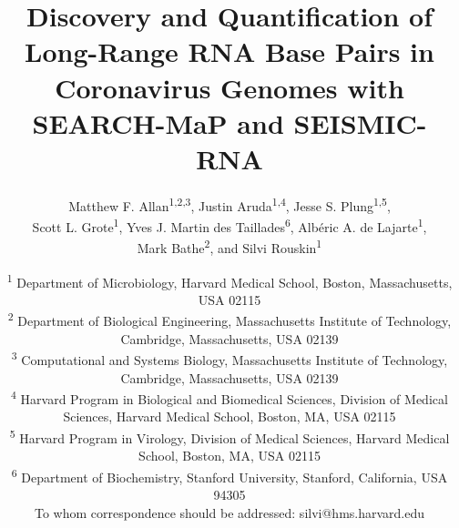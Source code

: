\documentclass[12pt,a4paper]{article}
\title{Discovery and Quantification of Long-Range RNA Base Pairs in Coronavirus Genomes with SEARCH-MaP and SEISMIC-RNA}
\author{Matthew F. Allan\textsuperscript{1,2,3}, Justin Aruda\textsuperscript{1,4}, Jesse S. Plung\textsuperscript{1,5}, \\ Scott L. Grote\textsuperscript{1}, Yves J. Martin des Taillades\textsuperscript{6}, Albéric A. de Lajarte\textsuperscript{1}, \\ Mark Bathe\textsuperscript{2}, and Silvi Rouskin\textsuperscript{1\textdagger}}
\date{
	\textsuperscript{1} Department of Microbiology, Harvard Medical School, Boston, Massachusetts, USA 02115 \\
	\textsuperscript{2} Department of Biological Engineering, Massachusetts Institute of Technology, Cambridge, Massachusetts, USA 02139 \\
	\textsuperscript{3} Computational and Systems Biology, Massachusetts Institute of Technology, Cambridge, Massachusetts, USA 02139 \\
	\textsuperscript{4} Harvard Program in Biological and Biomedical Sciences, Division of Medical Sciences, Harvard Medical School, Boston, MA, USA 02115 \\
	\textsuperscript{5} Harvard Program in Virology, Division of Medical Sciences, Harvard Medical School, Boston, MA, USA 02115 \\
	\textsuperscript{6} Department of Biochemistry, Stanford University, Stanford, California, USA 94305 \\
	\textsuperscript{\textdagger} To whom correspondence should be addressed: silvi@hms.harvard.edu \\
}
\begin{document}
\emergencystretch \textwidth

\begin{singlespace}
\maketitle
\end{singlespace}
\newpage

\newpage

\newpage

\newpage

\newpage

\newpage


\newpage
\begin{singlespace}
	
	
\end{singlespace}

\newpage

\end{document}
